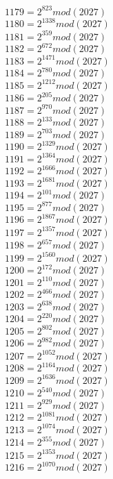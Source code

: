 \documentclass[12pt, letterpaper]{article}
\begin{document}
\begin{itemize}
\begin{multicols}{3}
$1179= 2^{823} mod (2027)$\\
$1180= 2^{1338} mod (2027)$\\
$1181= 2^{359} mod (2027)$\\
$1182= 2^{672} mod (2027)$\\
$1183= 2^{1471} mod (2027)$\\
$1184= 2^{780} mod (2027)$\\
$1185= 2^{1212} mod (2027)$\\
$1186= 2^{205} mod (2027)$\\
$1187= 2^{970} mod (2027)$\\
$1188= 2^{133} mod (2027)$\\
$1189= 2^{703} mod (2027)$\\
$1190= 2^{1329} mod (2027)$\\
$1191= 2^{1364} mod (2027)$\\
$1192= 2^{1666} mod (2027)$\\
$1193= 2^{1681} mod (2027)$\\
$1194= 2^{101} mod (2027)$\\
$1195= 2^{877} mod (2027)$\\
$1196= 2^{1867} mod (2027)$\\
$1197= 2^{1357} mod (2027)$\\
$1198= 2^{657} mod (2027)$\\
$1199= 2^{1560} mod (2027)$\\
$1200= 2^{172} mod (2027)$\\
$1201= 2^{110} mod (2027)$\\
$1202= 2^{466} mod (2027)$\\
$1203= 2^{638} mod (2027)$\\
$1204= 2^{220} mod (2027)$\\
$1205= 2^{802} mod (2027)$\\
$1206= 2^{982} mod (2027)$\\
$1207= 2^{1052} mod (2027)$\\
$1208= 2^{1164} mod (2027)$\\
$1209= 2^{1636} mod (2027)$\\
$1210= 2^{540} mod (2027)$\\
$1211= 2^{929} mod (2027)$\\
$1212= 2^{1081} mod (2027)$\\
$1213= 2^{1074} mod (2027)$\\
$1214= 2^{355} mod (2027)$\\
$1215= 2^{1353} mod (2027)$\\
$1216= 2^{1070} mod (2027)$\\

\end{multicols}
\end{itemize}
\end{document}
